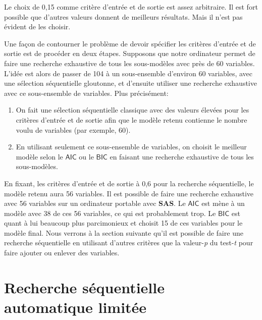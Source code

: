 \documentclass[
  11pt,
  letterpaper,
]{book}
\providecommand{\tightlist}{%
  \setlength{\itemsep}{0pt}\setlength{\parskip}{0pt}}
\theoremstyle{definition}
\theoremstyle{definition}
\theoremstyle{definition}
\theoremstyle{remark}
\begin{document}
Le choix de 0,15 comme critère d'entrée et de sortie est assez arbitraire. Il est fort possible que d'autres valeurs donnent de meilleurs résultats. Mais il n'est pas évident de les choisir.

Une façon de contourner le problème de devoir spécifier les critères d'entrée et de sortie est de procéder en deux étapes. Supposons que notre ordinateur permet de faire une recherche exhaustive de tous les sous-modèles avec près de 60 variables. L'idée est alors de passer de 104 à un sous-ensemble d'environ 60 variables, avec une sélection séquentielle gloutonne, et d'ensuite utiliser une recherche exhaustive avec ce sous-ensemble de variables. Plus précisément:

\begin{enumerate}
\def\labelenumi{\arabic{enumi})}
\tightlist
\item
  On fait une sélection séquentielle classique avec des valeurs élevées pour les critères d'entrée et de sortie afin que le modèle retenu contienne le nombre voulu de variables (par exemple, 60).
\item
  En utilisant seulement ce sous-ensemble de variables, on choisit le meilleur modèle selon le \(\mathsf{AIC}\) ou le \(\mathsf{BIC}\) en faisant une recherche exhaustive de tous les sous-modèles.
\end{enumerate}

En fixant, les critères d'entrée et de sortie à 0,6 pour la recherche séquentielle, le modèle retenu aura 56 variables. Il est possible de faire une recherche exhaustive avec 56 variables sur un ordinateur portable avec \textbf{SAS}. Le \(\mathsf{AIC}\) est mène à un modèle avec 38 de ces 56 variables, ce qui est probablement trop. Le \(\mathsf{BIC}\) est quant à lui beaucoup plus parcimonieux et choisit 15 de ces variables pour le modèle final. Nous verrons à la section suivante qu'il est possible de faire une recherche séquentielle en utilisant d'autres critères que la valeur-\emph{p} du test-\emph{t} pour faire ajouter ou enlever des variables.

\hypertarget{recherche-suxe9quentielle-automatique-limituxe9e}{%
\section{Recherche séquentielle automatique limitée}\label{recherche-suxe9quentielle-automatique-limituxe9e}}
\end{document}
